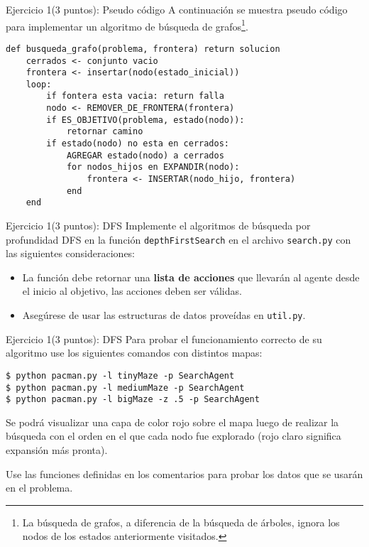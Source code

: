 \documentclass[10pt]{beamer}
\begin{document}
\begin{frame}[fragile]{Ejercicio 1(3 puntos): Pseudo código}
A continuación se muestra pseudo código para implementar un algoritmo de búsqueda de 
grafos\footnote{La búsqueda de grafos, a diferencia de la búsqueda de árboles, ignora los 
nodos de los estados anteriormente visitados.}.
\begin{lstlisting}
def busqueda_grafo(problema, frontera) return solucion
    cerrados <- conjunto vacio
    frontera <- insertar(nodo(estado_inicial))
    loop:
        if fontera esta vacia: return falla
        nodo <- REMOVER_DE_FRONTERA(frontera)
        if ES_OBJETIVO(problema, estado(nodo)): 
            retornar camino
        if estado(nodo) no esta en cerrados:
            AGREGAR estado(nodo) a cerrados
            for nodos_hijos en EXPANDIR(nodo):
                frontera <- INSERTAR(nodo_hijo, frontera)
            end
    end
\end{lstlisting}
    
\end{frame}

\begin{frame}[fragile]{Ejercicio 1(3 puntos): DFS}
Implemente el algoritmos de búsqueda por profundidad DFS en la función \texttt{depthFirstSearch} 
en el archivo \texttt{search.py} con las siguientes consideraciones:

\begin{itemize}
    \item La función debe retornar una \textbf{lista de acciones} que llevarán al agente desde 
    el inicio al objetivo, las acciones deben ser válidas.
    \item Asegúrese de usar las estructuras de datos proveídas en \texttt{util.py}.
\end{itemize}

\end{frame}

\begin{frame}[fragile]{Ejercicio 1(3 puntos): DFS}
Para probar el funcionamiento correcto de su algoritmo use los siguientes comandos 
con distintos mapas:

\begin{lstlisting}
$ python pacman.py -l tinyMaze -p SearchAgent
$ python pacman.py -l mediumMaze -p SearchAgent
$ python pacman.py -l bigMaze -z .5 -p SearchAgent
\end{lstlisting}

Se podrá visualizar una capa de color rojo sobre el mapa luego de realizar la búsqueda con 
el orden en el que cada nodo fue explorado (rojo claro significa expansión más pronta).

Use las funciones definidas en los comentarios para probar los datos que se usarán en el problema.
\end{frame}
\end{document}
